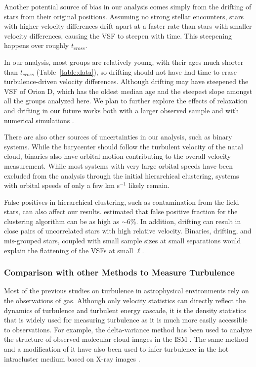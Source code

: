 Another potential source of bias in our analysis comes simply from the drifting of stars from their original positions. Assuming no strong stellar encounters, stars with higher velocity differences drift apart at a faster rate than stars with smaller velocity differences, causing the VSF to steepen with time. This steepening happens over roughly $t_{cross}$.

In our analysis, most groups are relatively young, with their ages much shorter than $t_{cross}$ (Table~\ref{table:data}), so drifting should not have had time to erase turbulence-driven velocity differences. Although drifting may have steepened the VSF of Orion D, which has the oldest median age and the steepest slope amongst all the groups analyzed here. We plan to further explore the effects of relaxation and drifting in our future works both with a larger observed sample and with numerical simulations \citep{li_disruption_2019}. 

There are also other sources of uncertainties in our analysis, such as binary systems. While the barycenter should follow the turbulent velocity of the natal cloud, binaries also have orbital motion contributing to the overall velocity measurement. While most systems with very large orbital speeds have been excluded from the analysis through the initial hierarchical clustering, systems with orbital speeds of only a few km s$^{-1}$ likely remain.

False positives in hierarchical clustering, such as contamination from the field stars, can also affect our results. \citet{kounkel_apogee-2_2018} estimated that false positive fraction for the clustering algorithm can be as high as $\sim$6\%. In addition, drifting can result in close pairs of uncorrelated stars with high relative velocity. Binaries, drifting, and mis-grouped stars, coupled with small sample sizes at small separations would explain the flattening of the VSFs at small $\ell$.

\subsubsection{Comparison with other Methods to Measure Turbulence}
Most of the previous studies on turbulence in astrophysical environments rely on the observations of gas. Although only velocity statistics can directly 
reflect the dynamics of turbulence and turbulent energy cascade, 
it is the density statistics that is widely used for measuring turbulence as it is much more easily accessible to observations. For example, the delta-variance method has been used to analyze the structure of observed molecular cloud images in the ISM \citep{stutzki_fractal_1998}. The same method and a modification of it \citep{arevalo_mexican_2012} have also been used to infer turbulence in the hot intracluster medium based on X-ray images \citep[e.g.,][]{zhuravleva_turbulent_2014}.%

